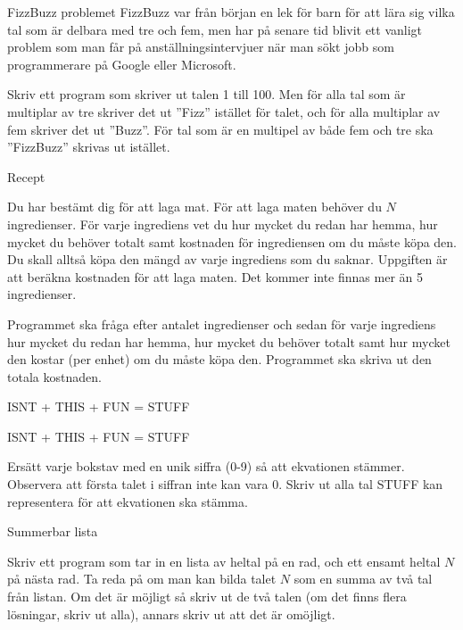 \documentclass[10pt]{beamer}
\begin{document}
\begin{frame}{FizzBuzz problemet}
FizzBuzz var från början en lek för barn för att lära sig vilka tal som är delbara med tre och fem, men har på senare tid blivit ett vanligt problem som man får på anställningsintervjuer när man sökt jobb som programmerare på Google eller Microsoft. 

Skriv ett program som skriver ut talen 1 till 100. Men för alla tal som är multiplar av tre skriver det ut ''Fizz'' istället för talet, och för alla multiplar av fem skriver det ut ''Buzz''. För tal som är en multipel av både fem och tre ska ''FizzBuzz'' skrivas ut istället. 
\end{frame}


\begin{frame}{Recept}

Du har bestämt dig för att laga mat. För att laga maten behöver du $N$ ingredienser. För varje ingrediens vet du hur mycket du redan har hemma, hur mycket du behöver totalt samt kostnaden för ingrediensen om du måste köpa den. Du skall alltså köpa den mängd av varje ingrediens som du saknar. Uppgiften är att beräkna kostnaden för att laga maten. Det kommer inte finnas mer än 5 ingredienser.

Programmet ska fråga efter antalet ingredienser och sedan för varje ingrediens hur mycket du redan har hemma, hur mycket du behöver totalt samt hur mycket den kostar (per enhet) om du måste köpa den. Programmet ska skriva ut den totala kostnaden. 

\end{frame}






\begin{frame}{ISNT + THIS + FUN = STUFF}

ISNT + THIS + FUN = STUFF

Ersätt varje bokstav med en unik siffra (0-9) så att ekvationen stämmer. Observera att första talet i siffran inte kan vara 0. Skriv ut alla tal STUFF kan representera för att ekvationen ska stämma. 

\end{frame}





\begin{frame}{Summerbar lista}

Skriv ett program som tar in en lista av heltal på en rad, och ett ensamt heltal $N$ på nästa rad. Ta reda på om man kan bilda talet $N$ som en summa av två tal från listan. Om det är möjligt så skriv ut de två talen (om det finns flera lösningar, skriv ut alla), annars skriv ut att det är omöjligt.

\end{frame}
\end{document}
